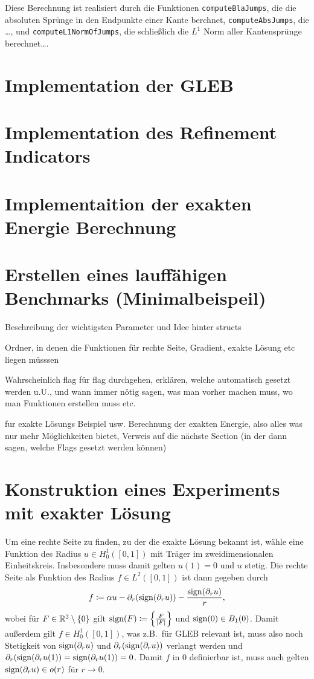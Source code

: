 Diese Berechnung ist realisiert durch die 
Funktionen \texttt{computeBlaJumps}, die die absoluten Sprünge
in den Endpunkte einer Kante berchnet, \texttt{computeAbsJumps}, die \ldots,
und \texttt{computeL1NormOfJumps}, die schließlich die $L^1$ Norm aller
Kantensprünge berechnet\ldots.



\section{Implementation der GLEB}

\section{Implementation des Refinement Indicators}

\section{Implementaition der exakten Energie Berechnung}


\section{Erstellen eines lauffähigen Benchmarks (Minimalbeispeil)}
Beschreibung der wichtigsten Parameter
und Idee hinter structs

Ordner, in denen die Funktionen für rechte Seite, Gradient, exakte
Lösung etc liegen müsssen

Wahrscheinlich flag für flag durchgehen, erklären, welche automatisch gesetzt 
werden u.U., und wann immer nötig sagen, was man vorher machen muss, wo man
Funktionen erstellen muss etc.

fur exakte Lösungs Beispiel usw.
Berechnung der exakten Energie, also alles was nur mehr Möglichkeiten bietet,
Verweis auf die nächste Section (in der dann sagen, welche Flags gesetzt werden 
können)

\section{Konstruktion eines Experiments mit exakter Lösung}
Um eine rechte Seite zu finden, zu der die exakte Lösung bekannt
ist, wähle eine Funktion des Radius $u\in H^1_0([0,1])$ mit Träger im 
zweidimensionalen Einheitskreis. Insbesondere muss damit gelten $u(1)=0$ und
$u$ stetig.
Die rechte Seite als Funktion des Radius $f\in L^2([0,1])$ ist dann gegeben
durch 
\begin{align*}
  f \coloneqq 
  \alpha u - \partial_r(\operatorname{sign}(\partial_r u)) - \frac{\operatorname{sign}(\partial_r u)}{r},
\end{align*}
wobei für $F\in\mathbb{R}^2\setminus\{0\}$ gilt 
$\operatorname{sign}(F)\coloneqq \left\{\frac{F}{|F|}\right\}$ 
und $\operatorname{sign}(0)\in B_1(0)$.
Damit außerdem gilt $f\in H^1_0([0,1])$, was z.B.\ für GLEB relevant ist, 
muss also noch Stetigkeit von $\operatorname{sign}(\partial_r u)$ und 
$\partial_r(\operatorname{sign}(\partial_r u))$ verlangt werden und 
$\partial_r(\operatorname{sign}(\partial_r u(1))=\operatorname{sign}(\partial_r u(1))=0$.
Damit $f$ in $0$ definierbar ist, muss auch gelten 
$\operatorname{sign}(\partial_r u) \in o(r)$ für $r\to 0$.

